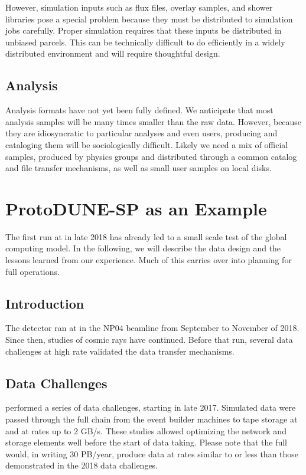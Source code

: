 However, simulation inputs such as flux files, overlay samples, and shower libraries pose a special problem because they must be distributed to simulation jobs carefully.  Proper simulation requires that these inputs be distributed in unbiased parcels.  This can be technically difficult to do efficiently in a widely distributed environment and will require thoughtful design. 

\subsection{Analysis}

Analysis formats have not yet been fully defined.  We anticipate that most analysis samples will be many times smaller than the raw data.  However, because they are idiosyncratic to particular analyses and even users,  producing and cataloging them will be sociologically difficult. 
Likely we need a mix of official samples, produced by physics groups and distributed through a common catalog and file transfer mechanisms, as well as small user samples on local disks. 


\section{ProtoDUNE-SP as an Example}
\label{ch:exec-comp-proto-SP}
The first   run at  in late 2018 has already led to a small scale test of the global computing model.  In the following, we will describe the  data design and the lessons learned from our experience. Much of this carries over into planning for full  operations. 

\subsection{Introduction}

The  detector ran at  in the NP04 beamline from September to November of 2018. Since then, studies of cosmic rays have continued. Before that run, several data challenges at high rate validated the data transfer mechanisms. 

\subsection{Data Challenges}

 performed a series of data challenges, starting in late 2017.  Simulated data were passed through the full chain from the event builder machines to tape storage at  and  at rates up to 2 GB/s.  These studies allowed optimizing the network and storage elements well before the start of data taking.
Please note that the full   would, in writing 30 PB/year, produce data at rates similar to or less than those demonstrated in the 2018 data challenges. 


